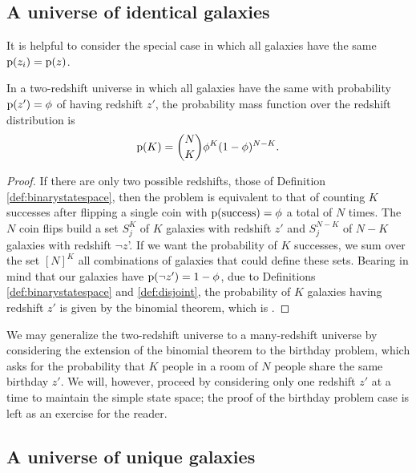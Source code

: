 \subsection{A universe of identical galaxies}

It is helpful to consider the special case in which all galaxies have the same \pzpdf\ $\mathrm{p}(z_{i}) = \mathrm{p}(z)$.

\begin{theorem}
	In a two-redshift universe in which all galaxies have the same \pzpdf with probability $\mathrm{p}(z') = \phi$ of having redshift $z'$, the probability mass function over the redshift distribution is
	\begin{equation}
	\eqlabel{eqn:binomial}
	\pr{K} = \binom{N}{K} \phi^{K} (1 - \phi)^{N - K} .
	\end{equation}
\end{theorem}

\begin{proof}
If there are only two possible redshifts, those of Definition \ref{def:binarystatespace}, then the problem is equivalent to that of counting $K$ successes after flipping a single coin with $\mathrm{p}(\mathrm{success}) = \phi$ a total of $N$ times.
The $N$ coin flips build a set $S^{K}_{j}$ of $K$ galaxies with redshift $z'$ and $S^{N-K}_{j}$ of $N - K$ galaxies with redshift $\lnot z$'.
If we want the probability of $K$ successes, we sum over the set $[N]^{K}$ all combinations of galaxies that could define these sets.
Bearing in mind that our galaxies have $\mathrm{p}(\lnot z') = 1 - \phi$, due to Definitions \ref{def:binarystatespace} and \ref{def:disjoint}, the probability of $K$ galaxies having redshift $z'$ is given by the binomial theorem, which is .
\end{proof}

We may generalize the two-redshift universe to a many-redshift universe by considering the extension of the binomial theorem to the birthday problem, which asks for the probability that $K$ people in a room of $N$ people share the same birthday $z'$.
We will, however, proceed by considering only one redshift $z'$ at a time to maintain the simple state space; the proof of the birthday problem case is left as an exercise for the reader.

\subsection{A universe of unique galaxies}

